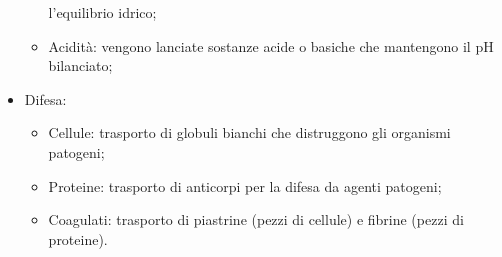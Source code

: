 \documentclass{article}
\begin{document}
\begin{itemize}
\begin{itemize}
                l'equilibrio idrico;
            \item Acidità: vengono lanciate sostanze acide o basiche che mantengono il pH
                bilanciato;
        \end{itemize}
    \item Difesa:
        \begin{itemize}
            \item Cellule: trasporto di globuli bianchi che distruggono gli organismi patogeni;
            \item Proteine: trasporto di anticorpi per la difesa da agenti patogeni;
            \item Coagulati: trasporto di piastrine (pezzi di cellule) e fibrine (pezzi di
                proteine).
        \end{itemize}
\end{itemize}

\newpage
\end{document}

